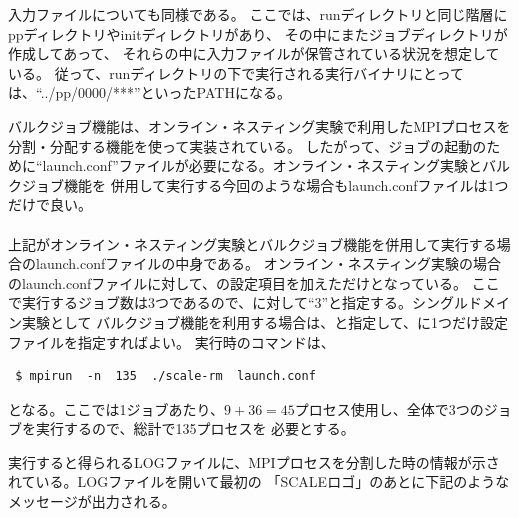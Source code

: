 入力ファイルについても同様である。
ここでは、runディレクトリと同じ階層にppディレクトリやinitディレクトリがあり、
その中にまたジョブディレクトリが作成してあって、
それらの中に入力ファイルが保管されている状況を想定している。
従って、runディレクトリの下で実行される実行バイナリにとっては、``../pp/0000/***''といったPATHになる。

バルクジョブ機能は、オンライン・ネスティング実験で利用したMPIプロセスを分割・分配する機能を使って実装されている。
したがって、ジョブの起動のために``launch.conf''ファイルが必要になる。オンライン・ネスティング実験とバルクジョブ機能を
併用して実行する今回のような場合もlaunch.confファイルは1つだけで良い。\\

\\

\noindent 上記がオンライン・ネスティング実験とバルクジョブ機能を併用して実行する場合のlaunch.confファイルの中身である。
オンライン・ネスティング実験の場合のlaunch.confファイルに対して、の設定項目を加えただけとなっている。
ここで実行するジョブ数は3つであるので、に対して``3''と指定する。シングルドメイン実験として
バルクジョブ機能を利用する場合は、と指定して、に1つだけ設定ファイルを指定すればよい。
実行時のコマンドは、

\begin{verbatim}
 $ mpirun  -n  135  ./scale-rm  launch.conf
\end{verbatim}

となる。ここでは1ジョブあたり、$9 + 36 = 45$プロセス使用し、全体で3つのジョブを実行するので、総計で135プロセスを
必要とする。

実行すると得られるLOGファイルに、MPIプロセスを分割した時の情報が示されている。LOGファイルを開いて最初の
「SCALEロゴ」のあとに下記のようなメッセージが出力される。\\

